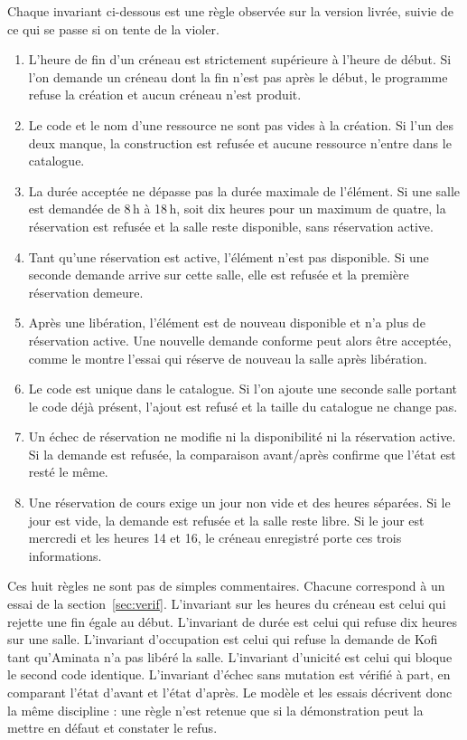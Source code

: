 \documentclass[11pt,a4paper]{article}
\begin{document}
Chaque invariant ci-dessous est une règle observée sur la version livrée, suivie de ce qui se passe si on tente de la violer.
\begin{enumerate}
\item L'heure de fin d'un créneau est strictement supérieure à l'heure de début. Si l'on demande un créneau dont la fin n'est pas après le début, le programme refuse la création et aucun créneau n'est produit.
\item Le code et le nom d'une ressource ne sont pas vides à la création. Si l'un des deux manque, la construction est refusée et aucune ressource n'entre dans le catalogue.
\item La durée acceptée ne dépasse pas la durée maximale de l'élément. Si une salle est demandée de 8\,h à 18\,h, soit dix heures pour un maximum de quatre, la réservation est refusée et la salle reste disponible, sans réservation active.
\item Tant qu'une réservation est active, l'élément n'est pas disponible. Si une seconde demande arrive sur cette salle, elle est refusée et la première réservation demeure.
\item Après une libération, l'élément est de nouveau disponible et n'a plus de réservation active. Une nouvelle demande conforme peut alors être acceptée, comme le montre l'essai qui réserve de nouveau la salle après libération.
\item Le code est unique dans le catalogue. Si l'on ajoute une seconde salle portant le code déjà présent, l'ajout est refusé et la taille du catalogue ne change pas.
\item Un échec de réservation ne modifie ni la disponibilité ni la réservation active. Si la demande est refusée, la comparaison avant/après confirme que l'état est resté le même.
\item Une réservation de cours exige un jour non vide et des heures séparées. Si le jour est vide, la demande est refusée et la salle reste libre. Si le jour est mercredi et les heures 14 et 16, le créneau enregistré porte ces trois informations.
\end{enumerate}

Ces huit règles ne sont pas de simples commentaires. Chacune correspond à un essai de la section~\ref{sec:verif}. L'invariant sur les heures du créneau est celui qui rejette une fin égale au début. L'invariant de durée est celui qui refuse dix heures sur une salle. L'invariant d'occupation est celui qui refuse la demande de Kofi tant qu'Aminata n'a pas libéré la salle. L'invariant d'unicité est celui qui bloque le second code identique. L'invariant d'échec sans mutation est vérifié à part, en comparant l'état d'avant et l'état d'après. Le modèle et les essais décrivent donc la même discipline : une règle n'est retenue que si la démonstration peut la mettre en défaut et constater le refus.
\end{document}
